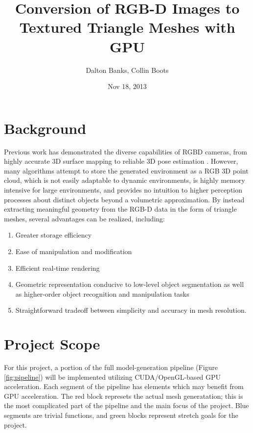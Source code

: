 \documentclass[letterpaper, 10 pt, conference]{ieeeconf}
\title{Conversion of RGB-D Images to Textured Triangle Meshes with GPU}
\author{Dalton Banks, Collin Boots}
\date{Nov 18, 2013}
\begin{document}
   \maketitle

\section{Background} 
Previous work has demonstrated the diverse capabilities of RGBD cameras, from highly accurate 3D surface mapping \cite{KinectFusion} to reliable 3D pose estimation \cite{Endres,Taguchi}. However, many algorithms attempt to store the generated environment as a RGB 3D point cloud, which is not easily adaptable to dynamic environments, is highly memory intensive for large environments, and provides no intuition to higher perception processes about distinct objects beyond a volumetric approximation. By instead extracting meaningful geometry from the RGB-D data in the form of triangle meshes, several advantages can be realized, including:

\begin{enumerate}
\item Greater storage efficiency
\item Ease of manipulation and modification
\item Efficient real-time rendering
\item Geometric representation conducive to low-level object segmentation as well as higher-order object recognition and manipulation tasks
\item Straightforward tradeoff between simplicity and accuracy in mesh resolution.
\end{enumerate}

\section{Project Scope}
For this project, a portion of the full model-generation pipeline (Figure \ref{fig:pipeline}) will be implemented utilizing CUDA/OpenGL-based GPU acceleration.  Each segment of the pipeline has elements which may benefit from GPU acceleration. The red block represets the actual mesh generatation; this is the most complicated part of the pipeline and the main focus of the project. Blue segments are trivial functions, and green blocks represent stretch goals for the project.
\end{document}
